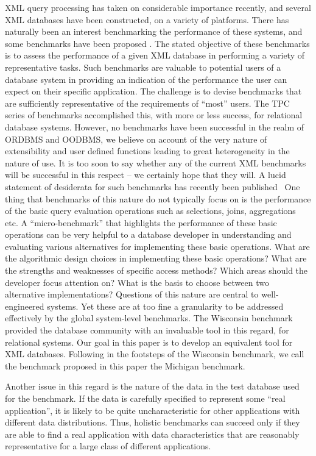XML query processing has taken on considerable
importance recently, and several XML databases \cite{tamino,
timber, ibm, microsoft, oracle, excelon, poet} have been
constructed, on a variety of platforms. There has naturally been
an interest benchmarking the performance of these systems, and
some benchmarks have been proposed \cite{xmach, xmark}.  The
stated objective of these benchmarks is to assess the performance
of a given XML database in performing a variety of representative
tasks. Such benchmarks are valuable to potential users of a database
system in providing an indication of the performance the user can
expect on their specific application.  The challenge is to devise
benchmarks that are sufficiently representative of the requirements of
``most'' users.  The TPC series of benchmarks accomplished this, with
more or less success, for relational database systems. However, no
benchmarks have been successful in the realm of ORDBMS and OODBMS, we
believe on account of the very nature of extensibility and user
defined functions leading to great heterogeneity in the nature of
use. It is too soon to say whether any of the current XML benchmarks
will be successful in this respect -- we certainly hope that they
will.  A lucid statement of desiderata for such benchmarks has
recently been published~\cite{SIGMODRECORD01Bench} One thing that
benchmarks of this nature do not typically focus on is the performance
of the basic query evaluation operations such as selections, joins,
aggregations etc.  A ``micro-benchmark'' that highlights the
performance of these basic operations can be very helpful to a
database developer in understanding and evaluating various
alternatives for implementing these basic operations.  What are the
algorithmic design choices in implementing these basic operations?
What are the strengths and weaknesses of specific access methods?
Which areas should the developer focus attention on? What is the basis
to choose between two alternative implementations?  Questions of this
nature are central to well-engineered systems.  Yet these are at too
fine a granularity to be addressed effectively by the global
system-level benchmarks. The Wisconsin benchmark~\cite{wiss} provided
the database community with an invaluable tool in this regard, for
relational systems. Our goal in this paper is to develop an equivalent
tool for XML databases. Following in the footsteps of the Wisconsin
benchmark, we call the benchmark proposed in this paper the Michigan
benchmark.

Another issue in this regard is the nature of the data in the test
database used for the benchmark.  If the data is carefully specified
to represent some ``real application'', it is likely to be quite
uncharacteristic for other applications with different data
distributions.  Thus, holistic benchmarks can succeed only if they are
able to find a real application with data characteristics that are
reasonably representative for a large class of different applications.

